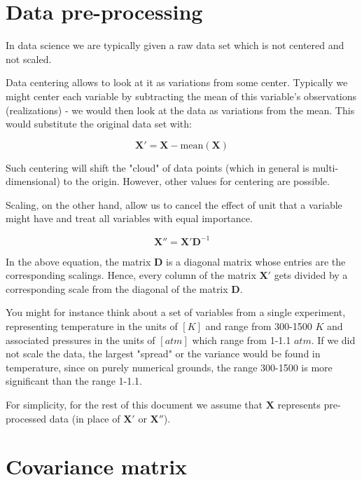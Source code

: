 \documentclass[10pt,twocolumn]{article}
\begin{document}
\section{Data pre-processing}

In data science we are typically given a raw data set which is not centered and not scaled. 

Data centering allows to look at it as variations from some center. Typically we might center each variable by subtracting the mean of this variable's observations (realizations) - we would then look at the data as variations from the mean. This would substitute the original data set with:

\begin{equation}
\bm{X'} = \bm{X} - \text{mean}(\bm{X})
\end{equation}

Such centering will shift the "cloud" of data points (which in general is multi-dimensional) to the origin. However, other values for centering are possible.

Scaling, on the other hand, allow us to cancel the effect of unit that a variable might have and treat all variables with equal importance. 

\begin{equation}
\bm{X''} = \bm{X'}\bm{D}^{-1}
\end{equation}

In the above equation, the matrix $\bm{D}$ is a diagonal matrix whose entries are the corresponding scalings. Hence, every column of the matrix $\bm{X'}$ gets divided by a corresponding scale from the diagonal of the matrix $\bm{D}$.

You might for instance think about a set of variables from a single experiment, representing temperature in the units of $[K]$ and range from 300-1500 $K$ and associated pressures in the units of $[atm]$ which range from 1-1.1 $atm$. If we did not scale the data, the largest "spread" or the variance would be found in temperature, since on purely numerical  grounds, the range 300-1500 is more significant than the range 1-1.1.

For simplicity, for the rest of this document we assume that $\bm{X}$ represents pre-processed data (in place of $\bm{X'}$ or $\bm{X''}$).

\section{Covariance matrix}
\end{document}
